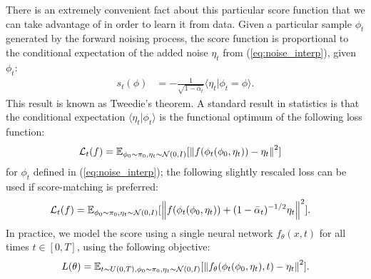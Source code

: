 \documentclass{article}
\theoremstyle{plain}
\theoremstyle{definition}
\theoremstyle{remark}
\begin{document}
There is an extremely convenient fact about this particular score function that we can take advantage of in order to learn it from data. Given a particular sample $\phi_t$ generated by the forward noising process, the score function is proportional to the conditional expectation of the added noise $\eta_t$ from (\ref{eq:noise_interp}), given $\phi_t$:
\begin{align}\label{eq:score_noise_connection}
    s_t(\phi) &= -\frac{1}{\sqrt{1 - \bar{\alpha}_t}} \langle \eta_t | \phi_t=\phi\rangle.
\end{align}
This result is known as Tweedie's theorem. A standard result in statistics is that the conditional expectation $\langle \eta_t | \phi_t \rangle$ is the functional optimum of the following loss function:
\begin{align}\label{eq:loss_func}
    \mathcal{L}_t(f) &= \mathbb{E}_{\phi_0 \sim \pi_0,\eta_t \sim \mathcal{N}(0,I)}[\norm{f(\phi_t(\phi_0,\eta_t)) - \eta_t}^2] 
\end{align}
for $\phi_t$ defined in (\ref{eq:noise_interp}); the following slightly rescaled loss can be used if score-matching is preferred:
\begin{align}\label{eq:noise_score_match}
    \mathcal{L}_t(f) &= \mathbb{E}_{\phi_0 \sim \pi_0,\eta_t \sim \mathcal{N}(0,I)}[\norm{f(\phi_t(\phi_0,\eta_t)) + (1 - \bar{\alpha}_t)^{-1/2}\eta_t}^2]. 
\end{align}
In practice, we model the score using a single neural network $f_\theta(x,t)$ for all times $t \in [0,T]$, using the following objective:
\begin{align}
    L(\theta) = \mathbb{E}_{t \sim U(0,T), \phi_0 \sim \pi_0,\eta_t \sim \mathcal{N}(0,I) }[\norm{f_\theta(\phi_t(\phi_0,\eta_t),t) - \eta_t}^2].
\end{align}
\end{document}
